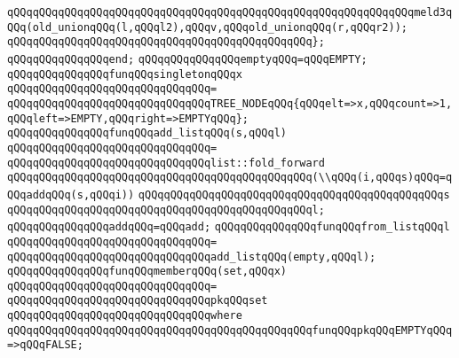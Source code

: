 \verb|qQQqqQQqqQQqqQQqqQQqqQQqqQQqqQQqqQQqqQQqqQQqqQQqqQQqqQQqqQQqqQQqmeld3qQQq(old_unionqQQq(l,qQQql2),qQQqv,qQQqold_unionqQQq(r,qQQqr2));|\newline
\verb|qQQqqQQqqQQqqQQqqQQqqQQqqQQqqQQqqQQqqQQqqQQqqQQq};|\newline
\verb|qQQqqQQqqQQqqQQqend;|\newline
\newline
\verb|qQQqqQQqqQQqqQQqemptyqQQq=qQQqEMPTY;|\newline
\newline
\verb|qQQqqQQqqQQqqQQqfunqQQqsingletonqQQqx|\newline
\verb|qQQqqQQqqQQqqQQqqQQqqQQqqQQqqQQq=|\newline
\verb|qQQqqQQqqQQqqQQqqQQqqQQqqQQqqQQqTREE_NODEqQQq{qQQqelt=>x,qQQqcount=>1,qQQqleft=>EMPTY,qQQqright=>EMPTYqQQq};|\newline
\newline
\verb|qQQqqQQqqQQqqQQqfunqQQqadd_listqQQq(s,qQQql)|\newline
\verb|qQQqqQQqqQQqqQQqqQQqqQQqqQQqqQQq=|\newline
\verb|qQQqqQQqqQQqqQQqqQQqqQQqqQQqqQQqlist::fold_forward|\newline
\verb|qQQqqQQqqQQqqQQqqQQqqQQqqQQqqQQqqQQqqQQqqQQqqQQq(\\qQQq(i,qQQqs)qQQq=qQQqaddqQQq(s,qQQqi))|\newline
\verb|qQQqqQQqqQQqqQQqqQQqqQQqqQQqqQQqqQQqqQQqqQQqqQQqs|\newline
\verb|qQQqqQQqqQQqqQQqqQQqqQQqqQQqqQQqqQQqqQQqqQQqqQQql;|\newline
\newline
\verb|qQQqqQQqqQQqqQQqaddqQQq=qQQqadd;|\newline
\newline
\verb|qQQqqQQqqQQqqQQqfunqQQqfrom_listqQQql|\newline
\verb|qQQqqQQqqQQqqQQqqQQqqQQqqQQqqQQq=|\newline
\verb|qQQqqQQqqQQqqQQqqQQqqQQqqQQqqQQqadd_listqQQq(empty,qQQql);|\newline
\newline
\verb|qQQqqQQqqQQqqQQqfunqQQqmemberqQQq(set,qQQqx)|\newline
\verb|qQQqqQQqqQQqqQQqqQQqqQQqqQQqqQQq=|\newline
\verb|qQQqqQQqqQQqqQQqqQQqqQQqqQQqqQQqpkqQQqset|\newline
\verb|qQQqqQQqqQQqqQQqqQQqqQQqqQQqqQQqwhere|\newline
\verb|qQQqqQQqqQQqqQQqqQQqqQQqqQQqqQQqqQQqqQQqqQQqqQQqfunqQQqpkqQQqEMPTYqQQq=>qQQqFALSE;|\newline
